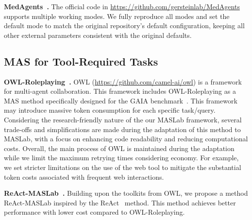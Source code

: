 \documentclass{article}
\begin{document}
\textbf{MedAgents~\cite{tang2024medagents}.}  
The official code in \url{https://github.com/gersteinlab/MedAgents} supports multiple working modes.
We fully reproduce all modes and set the default mode to match the original repository's default configuration, keeping all other external parameters consistent with the original defaults.

\subsection{MAS for Tool-Required Tasks}

\textbf{OWL-Roleplaying~\cite{owl2025}.}
OWL (\url{https://github.com/camel-ai/owl}) is a framework for multi-agent collaboration.
This framework includes OWL-Roleplaying as a MAS method specifically designed for the GAIA benchmark~\cite{mialon2024gaia}.
This framework may introduce massive token consumption for each specific task/query.
Considering the research-friendly nature of the our MASLab framework, several trade-offs and simplifications are made during the adaptation of this method to MASLab, with a focus on enhancing code readability and reducing computational costs.
Overall, the main process of OWL is maintained during the adaptation while we limit the maximum retrying times considering economy.
For example, we set stricter limitations on the use of the web tool to mitigate the substantial token costs associated with frequent web interactions.

\textbf{ReAct-MASLab~\cite{react}.}
Building upon the toolkits from OWL, we propose a method ReAct-MASLab inspired by the ReAct~\cite{react} method.
This method achieves better performance with lower cost compared to OWL-Roleplaying.
\end{document}

